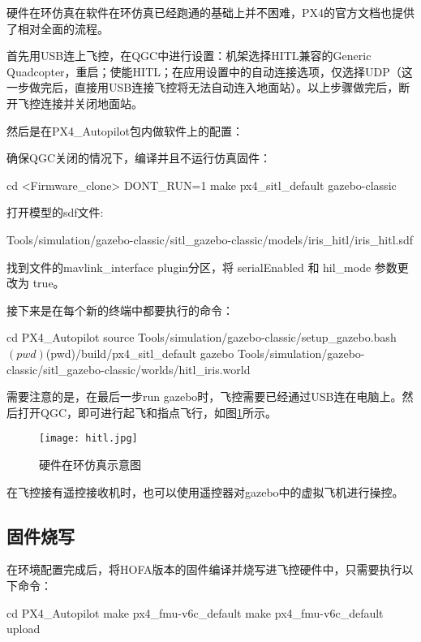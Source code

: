硬件在环仿真在软件在环仿真已经跑通的基础上并不困难，PX4的官方文档也提供了相对全面的流程\cite{px4hitl}。

首先用USB连上飞控，在QGC中进行设置：机架选择HITL兼容的Generic Quadcopter，重启；使能HITL；在应用设置中的自动连接选项，仅选择UDP（这一步做完后，直接用USB连接飞控将无法自动连入地面站）。以上步骤做完后，断开飞控连接并关闭地面站。

然后是在PX4\_Autopilot包内做软件上的配置\cite{px4hitl}：

确保QGC关闭的情况下，编译并且不运行仿真固件：

\begin{codeblock}[language=C]
  cd <Firmware_clone>
  DONT_RUN=1 make px4_sitl_default gazebo-classic
\end{codeblock}


打开模型的sdf文件:

Tools/simulation/gazebo-classic/sitl\_gazebo-classic/models/iris\_hitl/iris\_hitl.sdf

找到文件的mavlink\_interface plugin分区，将 serialEnabled 和 hil\_mode 参数更改为 true。

接下来是在每个新的终端中都要执行的命令：
\begin{codeblock}[language=C]
  cd PX4_Autopilot
  source Tools/simulation/gazebo-classic/setup_gazebo.bash $(pwd) $(pwd)/build/px4_sitl_default
  gazebo Tools/simulation/gazebo-classic/sitl_gazebo-classic/worlds/hitl_iris.world
\end{codeblock}



需要注意的是，在最后一步run gazebo时，飞控需要已经通过USB连在电脑上。然后打开QGC，即可进行起飞和指点飞行，如图\ref{hitl}所示。
\begin{figure}[!h]
  \centering
  \texttt{[image: hitl.jpg]}
  \caption{硬件在环仿真示意图}
  \label{hitl}
\end{figure}

在飞控接有遥控接收机时，也可以使用遥控器对gazebo中的虚拟飞机进行操控。

\subsection*{固件烧写}

在环境配置完成后，将HOFA版本的固件编译并烧写进飞控硬件中，只需要执行以下命令：
\begin{codeblock}[language=C]
  cd PX4_Autopilot
  make px4_fmu-v6c_default
  make px4_fmu-v6c_default upload
\end{codeblock}


